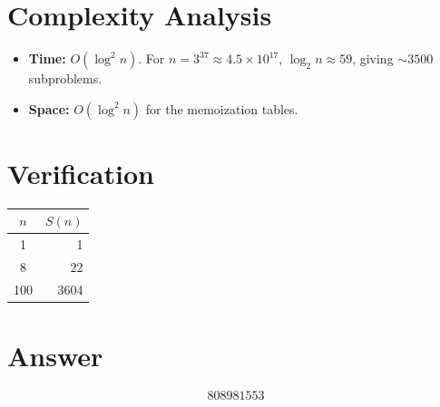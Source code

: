 \documentclass[11pt]{article}
\begin{document}
\section{Complexity Analysis}

\begin{itemize}
    \item \textbf{Time:} $O(\log^2 n)$. For $n = 3^{37} \approx 4.5 \times 10^{17}$, $\log_2 n \approx 59$, giving ${\sim}3500$ subproblems.
    \item \textbf{Space:} $O(\log^2 n)$ for the memoization tables.
\end{itemize}

\section{Verification}

\begin{center}
\begin{tabular}{cr}
\toprule
$n$ & $S(n)$ \\
\midrule
1 & 1 \\
8 & 22 \\
100 & 3604 \\
\bottomrule
\end{tabular}
\end{center}

\section{Answer}

\[
\boxed{808981553}
\]
\end{document}
